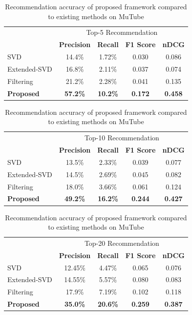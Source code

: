 \documentclass[a4paper,12pt]{report}
\begin{document}
\begin{table}[!htb]
    \centering
    \caption{Recommendation accuracy of proposed framework compared to existing methods on MuTube}
    \begin{tabular}{|l || c c c c|}
    \hline
         & \multicolumn{4}{c|}{Top-5 Recommendation} \\
    \cline{2-5}
         &  \textbf{Precision} & \textbf{Recall} & \textbf{F1 Score} & \textbf{nDCG} \\
    \hline
    SVD     & 14.4\% & 1.72\% & 0.030 & 0.086 \\
    Extended-SVD & 16.8\% & 2.11\% & 0.037 & 0.074\\
    Filtering & 21.2\% & 2.28\% & 0.041 & 0.135\\
    \textbf{Proposed}  & \textbf{57.2\%} & \textbf{10.2\%} & \textbf{0.172} & \textbf{0.458} \\
    \hline
    \end{tabular}
    \bigskip
    
    
    \begin{tabular}{|l || c c c c|}
    \hline
         & \multicolumn{4}{c|}{Top-10 Recommendation} \\
    \cline{2-5}
         &  \textbf{Precision} & \textbf{Recall} & \textbf{F1 Score} & \textbf{nDCG} \\
    \hline
    SVD     & 13.5\% & 2.33\% & 0.039 & 0.077 \\
    Extended-SVD & 14.5\% & 2.69\% & 0.045 & 0.082\\
    Filtering & 18.0\% & 3.66\% & 0.061 & 0.124\\
    \textbf{Proposed}  & \textbf{49.2\%} & \textbf{16.2\%} & \textbf{0.244} & \textbf{0.427} \\
    \hline
    \end{tabular}
    \bigskip
    
    \begin{tabular}{|l || c c c c|}
    \hline
         & \multicolumn{4}{c|}{Top-20 Recommendation} \\
    \cline{2-5}
         &  \textbf{Precision} & \textbf{Recall} & \textbf{F1 Score} & \textbf{nDCG} \\
    \hline
    SVD     & 12.45\% & 4.47\% & 0.065 & 0.076 \\
    Extended-SVD & 14.55\% & 5.57\% & 0.080 & 0.083\\
    Filtering & 17.9\% & 7.19\% & 0.102 & 0.118\\
    \textbf{Proposed}  & \textbf{35.0\%} & \textbf{20.6\%} & \textbf{0.259} & \textbf{0.387} \\
    \hline
    \end{tabular}
    \label{tab:MuTube_acc}
\end{table}
\end{document}
